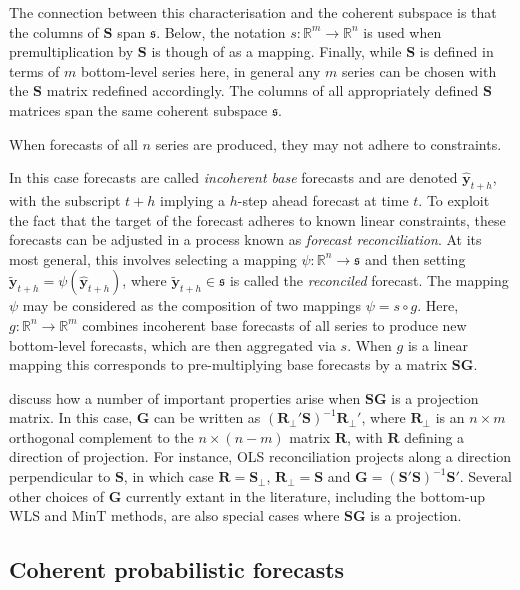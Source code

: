 \documentclass[12pt]{article}
\theoremstyle{definition}
\begin{document}
The connection between this characterisation and the coherent subspace is that the columns of $\bm{S}$ span $\mathfrak{s}$.  Below, the notation $s:\mathbb{R}^m\rightarrow\mathbb{R}^n$ is used when premultiplication by $\bm{S}$ is though of as a mapping.  Finally, while $\bm{S}$ is defined in terms of $m$ bottom-level series here, in general any $m$ series can be chosen with the $\bm{S}$ matrix redefined accordingly.  The columns of all appropriately defined $\bm{S}$ matrices span the same coherent subspace $\mathfrak{s}$.

When forecasts of all $n$ series are produced, they may not adhere to constraints.

In this case forecasts are called {\em incoherent base} forecasts and are denoted $\hat{\bm y}_{t+h}$, with the subscript $t+h$ implying a $h$-step ahead forecast at time $t$.  To exploit the fact that the target of the forecast adheres to known linear constraints, these forecasts can be adjusted in a process known as {\em forecast reconciliation}.  At its most general, this involves selecting a mapping $\psi:\mathbb{R}^n\rightarrow\mathfrak{s}$ and then setting $\tilde{\bm y}_{t+h}=\psi(\hat{\bm y}_{t+h})$, where $\tilde{\bm y}_{t+h}\in\mathfrak{s}$ is called the {\em reconciled} forecast.  The mapping $\psi$ may be considered as the composition of two mappings $\psi=s\circ g$. Here, $g:\mathbb{R}^{n}\rightarrow\mathbb{R}^{m}$ combines incoherent base forecasts of all series to produce new bottom-level forecasts, which are then aggregated via $s$.  When $g$ is a linear mapping this corresponds to pre-multiplying base forecasts by a matrix $\bm{S}\bm{G}$.

\cite{PanEtAl2019HF} discuss how a number of important properties arise when $\bm{S}\bm{G}$ is a projection matrix.  In this case, ${\bm G}$ can be written as $(\bm{R}_{\perp}'\bm{S})^{-1}\bm{R}_{\perp}'$, where $\bm{R}_{\perp}$ is an $n\times m$ orthogonal complement to the $n\times(n-m)$ matrix $\bm{R}$, with $\bm{R}$ defining a direction of projection.  For instance, OLS reconciliation \citep{HynEtAl2011} projects along a direction perpendicular to $\bm{S}$, in which case $\bm{R}=\bm{S}_{\perp}$, $\bm{R}_{\perp}=\bm{S}$ and $\bm{G}=(\bm{S}'\bm{S})^{-1}\bm{S}'$.  Several other choices of $\bm{G}$ currently extant in the literature, including the bottom-up \citep{Dunn1976} WLS \citep[][]{Hyndman2016,AthEtAl2017} and MinT \citep{WicEtAl2019} methods, are also special cases where $\bm{S}\bm{G}$ is a projection. 

\subsection{Coherent probabilistic forecasts}\label{subsec:cohprobf}
\end{document}
